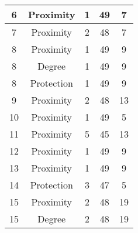 \documentclass[results.tex]{subfiles}
\begin{document}
\begin{center}
\begin{tabular}{| c || c | c | c | c |}
            \hline
            6                       & Proximity                    & 1                      & 49                      & 7                    \\
            \hline
            7                       & Proximity                    & 2                      & 48                      & 7                    \\
            \hline
            8                       & Proximity                    & 1                      & 49                      & 9                    \\
            \hline
            8                       & Degree                       & 1                      & 49                      & 9                    \\
            \hline
            8                       & Protection                   & 1                      & 49                      & 9                    \\
            \hline
            9                       & Proximity                    & 2                      & 48                      & 13                   \\
            \hline
            10                      & Proximity                    & 1                      & 49                      & 5                    \\
            \hline
            11                      & Proximity                    & 5                      & 45                      & 13                   \\
            \hline
            12                      & Proximity                    & 1                      & 49                      & 9                    \\
            \hline
            13                      & Proximity                    & 1                      & 49                      & 9                    \\
            \hline
            14                      & Protection                   & 3                      & 47                      & 5                    \\
            \hline
            15                      & Proximity                    & 2                      & 48                      & 19                   \\
            \hline
            15                      & Degree                       & 2                      & 48                      & 19                   \\

\end{tabular}
\end{center}
\end{document}
